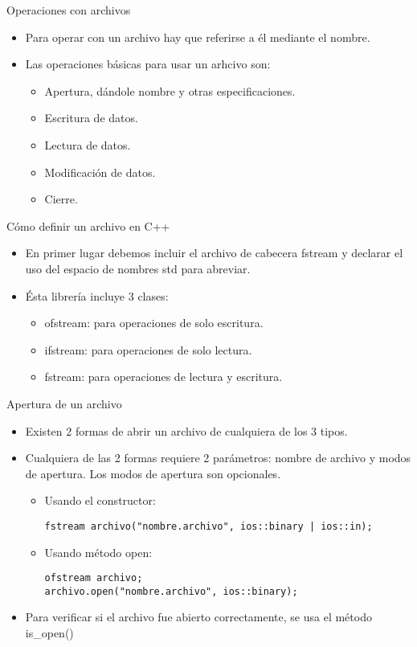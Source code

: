\documentclass[aspectratio=169]{beamer}
\begin{document}
\begin{frame}{Operaciones con archivos}
\begin{itemize}
\item Para operar con un archivo hay que referirse a él mediante el nombre.
\item Las operaciones básicas para usar un arhcivo son:
\begin{itemize}
\item Apertura, dándole nombre y otras especificaciones.
\item Escritura de datos.
\item Lectura de datos.
\item Modificación de datos.
\item Cierre.
\end{itemize}
\end{itemize}
\end{frame}

\begin{frame}{Cómo definir un archivo en C++}
\begin{itemize}
\item En primer lugar debemos incluir el archivo de cabecera \alert{fstream}
y declarar el uso del espacio de nombres \alert{std} para abreviar.
\item Ésta librería incluye 3 clases:
\begin{itemize}
\item ofstream: para operaciones de solo escritura.
\item ifstream: para operaciones de solo lectura.
\item fstream: para operaciones de lectura y escritura.
\end{itemize}
\end{itemize}
\end{frame}

\begin{frame}[fragile]{Apertura de un archivo}
\begin{itemize}
\item Existen 2 formas de abrir un archivo de cualquiera de los 3 tipos.
\item Cualquiera de las 2 formas requiere 2 parámetros: nombre de archivo y
modos de apertura. Los modos de apertura son opcionales.
\begin{itemize}
\item Usando el constructor:
\begin{lstlisting}
fstream archivo("nombre.archivo", ios::binary | ios::in);
\end{lstlisting}
\item Usando método open:
\begin{lstlisting}
ofstream archivo;
archivo.open("nombre.archivo", ios::binary);
\end{lstlisting}
\end{itemize}
\item Para verificar si el archivo fue abierto correctamente, se usa el método is\_open()
\end{itemize}
\end{frame}
\end{document}
